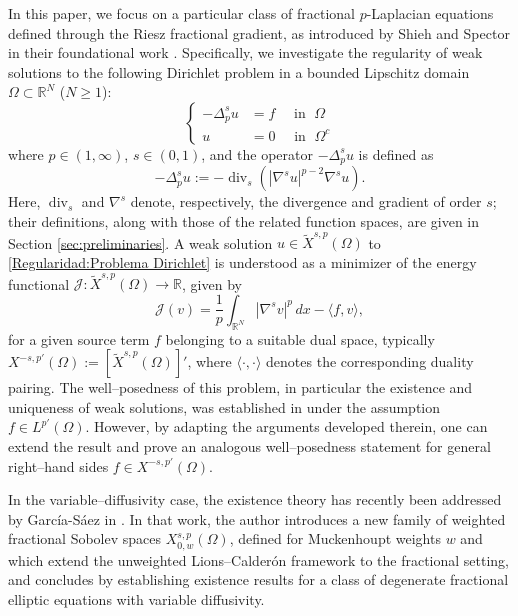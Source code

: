 \documentclass[]{amsart}
\theoremstyle{definition}
\theoremstyle{definition}
\theoremstyle{remark}
\numberwithin{equation}{section}
\begin{document}
	In this paper, we focus on a particular class of fractional \( p \)-Laplacian equations defined through the Riesz fractional gradient, as introduced by Shieh and Spector in their foundational work \cite{shieh2015new}. Specifically, we investigate the regularity of weak solutions to the following Dirichlet problem in a bounded Lipschitz domain \( \Omega \subset \mathbb{R}^N \) ($N \ge 1$):
	\begin{equation}
		\label{Regularidad:Problema Dirichlet}
		\left\{
		\begin{aligned}
			-\Delta^{s}_{p} u &= f \quad \text{ in } \; \Omega \\
			u &= 0 \quad \text{ in } \; \Omega^c
		\end{aligned}
		\right. 
	\end{equation}
	where \( p \in (1, \infty) \), \( s \in (0,1) \), and the operator \( -\Delta^{s}_{p} u \) is defined as
	\[
	-\Delta^{s}_{p} u := - \operatorname{div}_{s}\left(|\nabla^{s} u|^{p-2} \nabla^{s} u\right).
	\]
    Here, $\operatorname{div}_{s}$ and $\nabla^s$ denote, respectively, the divergence and gradient of order $s$; their definitions, along with those of the related function spaces, are given in Section \ref{sec:preliminaries}. A weak solution \( u \in \widetilde{X}^{s,p}(\Omega) \) to \eqref{Regularidad:Problema Dirichlet} is understood as a minimizer of the energy functional \( \mathcal{J} : \widetilde{X}^{s,p}(\Omega) \rightarrow \mathbb{R} \), given by
	\begin{equation}
		\label{Regularidad: Operadores Formulación Debil}
		\mathcal{J}(v) = \frac{1}{p}\int_{\mathbb{R}^N} \left| \nabla^{s} v \right|^p \, dx - \langle f, v \rangle,
	\end{equation}
for a given source term \( f \) belonging to a suitable dual space, typically \( X^{-s,p'}(\Omega) := [\widetilde{X}^{s,p}(\Omega)]' \), where $\langle \cdot, \cdot \rangle$ denotes the corresponding duality pairing. The well–posedness of this problem, in particular the existence and uniqueness of weak solutions, was established in \cite{shieh2015new} under the assumption \( f \in L^{p'}(\Omega) \). However, by adapting the arguments developed therein, one can extend the result and prove an analogous well–posedness statement for 
general right–hand sides \( f \in X^{-s,p'}(\Omega) \).

In the variable–diffusivity case, the existence theory has recently been addressed by García-Sáez in \cite{garcia2025fractional}. In that work, the author introduces a new family of weighted fractional Sobolev spaces \( X^{s,p}_{0,w}(\Omega) \), defined for Muckenhoupt weights $w$ and which extend the unweighted Lions–Calder\'on framework to the fractional setting, and concludes by establishing existence results for a class of degenerate fractional elliptic equations with variable diffusivity.
\end{document}
